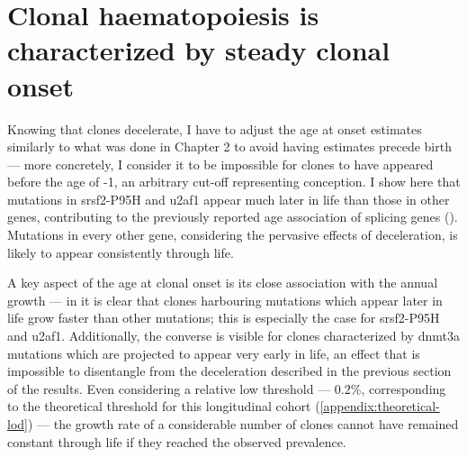 \section{Clonal haematopoiesis is characterized by steady clonal onset}

Knowing that clones decelerate, I have to adjust the age at onset estimates similarly to what was done in Chapter 2 to avoid having estimates precede birth --- more concretely, I consider it to be impossible for clones to have appeared before the age of -1, an arbitrary cut-off representing conception. I show here that mutations in \ac{srsf2}-P95H and \ac{u2af1} appear much later in life than those in other genes, contributing to the previously reported age association of splicing genes \cite{McKerrell2015-rl} (). Mutations in every other gene, considering the pervasive effects of deceleration, is likely to appear consistently through life.

\begin{figure}[!ht]
	\label{fig:ages-at-onset}
\end{figure}

A key aspect of the age at clonal onset is its close association with the annual growth --- in  it is clear that clones harbouring mutations which appear later in life grow faster than other mutations; this is especially the case for \ac{srsf2}-P95H and \ac{u2af1}. Additionally, the converse is visible for clones characterized by \ac{dnmt3a} mutations which are projected to appear very early in life, an effect that is impossible to disentangle from the deceleration described in the previous section of the results. Even considering a relative low threshold --- 0.2\%, corresponding to the theoretical threshold for this longitudinal cohort (\autoref{appendix:theoretical-lod}) --- the growth rate of a considerable number of clones cannot have remained constant through life if they reached the observed prevalence.

\begin{figure}[!ht]
	\label{fig:age-at-onset-vs-growth}
\end{figure}

